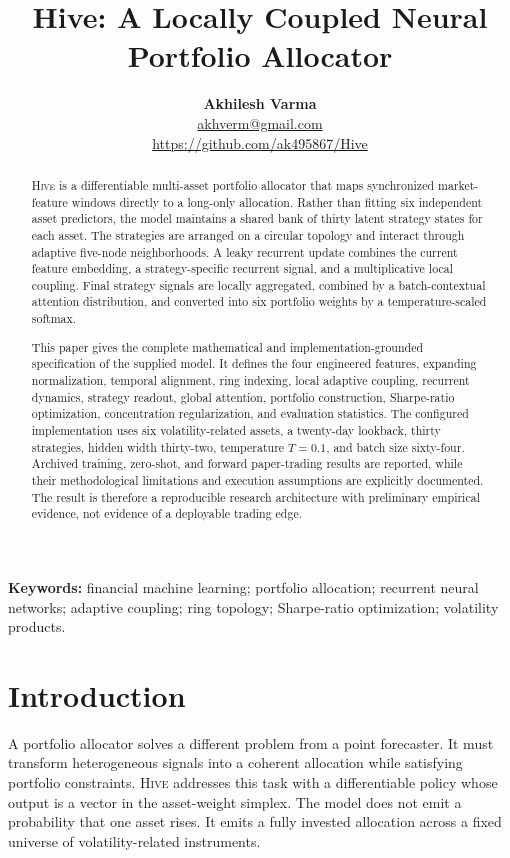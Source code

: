 \documentclass[10pt,a4paper,twocolumn]{article}
\title{\vspace{-1.2em}\textbf{Hive: A Locally Coupled Neural Portfolio Allocator}}
\author{\textbf{Akhilesh Varma}\\
\href{mailto:akhverm@gmail.com}{akhverm@gmail.com}\\
\url{https://github.com/ak495867/Hive}}
\date{}
\newcommand{\Hive}{\textsc{Hive}}
\begin{document}
\twocolumn[\maketitle\vspace{-1.0em}]

\begin{abstract}
\Hive{} is a differentiable multi-asset portfolio allocator that maps synchronized market-feature windows directly to a long-only allocation. Rather than fitting six independent asset predictors, the model maintains a shared bank of thirty latent strategy states for each asset. The strategies are arranged on a circular topology and interact through adaptive five-node neighborhoods. A leaky recurrent update combines the current feature embedding, a strategy-specific recurrent signal, and a multiplicative local coupling. Final strategy signals are locally aggregated, combined by a batch-contextual attention distribution, and converted into six portfolio weights by a temperature-scaled softmax.

This paper gives the complete mathematical and implementation-grounded specification of the supplied model. It defines the four engineered features, expanding normalization, temporal alignment, ring indexing, local adaptive coupling, recurrent dynamics, strategy readout, global attention, portfolio construction, Sharpe-ratio optimization, concentration regularization, and evaluation statistics. The configured implementation uses six volatility-related assets, a twenty-day lookback, thirty strategies, hidden width thirty-two, temperature $T=0.1$, and batch size sixty-four. Archived training, zero-shot, and forward paper-trading results are reported, while their methodological limitations and execution assumptions are explicitly documented. The result is therefore a reproducible research architecture with preliminary empirical evidence, not evidence of a deployable trading edge.
\end{abstract}

\textbf{Keywords:} financial machine learning; portfolio allocation; recurrent neural networks; adaptive coupling; ring topology; Sharpe-ratio optimization; volatility products.

\section{Introduction}
A portfolio allocator solves a different problem from a point forecaster. It must transform heterogeneous signals into a coherent allocation while satisfying portfolio constraints. \Hive{} addresses this task with a differentiable policy whose output is a vector in the asset-weight simplex. The model does not emit a probability that one asset rises. It emits a fully invested allocation across a fixed universe of volatility-related instruments.
\end{document}
